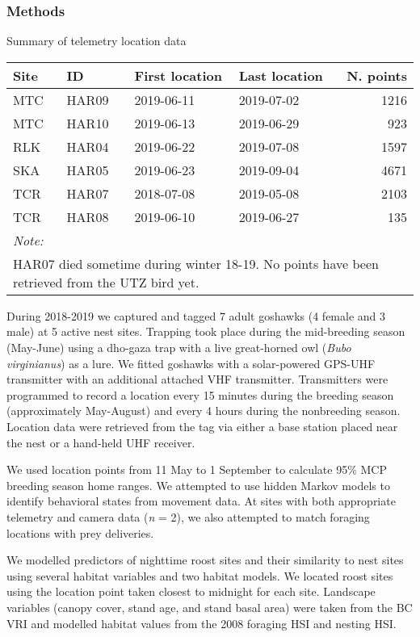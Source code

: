 \documentclass[]{article}
\begin{document}
\subsubsection{Methods}\label{methods-1}

\begin{capctable}

\caption{\label{tab:unnamed-chunk-4}Summary of telemetry location data}
\centering
\begin{tabular}[t]{llllr}
\toprule
Site & ID & First location & Last location & N. points\\
\midrule
MTC & HAR09 & 2019-06-11 & 2019-07-02 & 1216\\
MTC & HAR10 & 2019-06-13 & 2019-06-29 & 923\\
RLK & HAR04 & 2019-06-22 & 2019-07-08 & 1597\\
SKA & HAR05 & 2019-06-23 & 2019-09-04 & 4671\\
TCR & HAR07 & 2018-07-08 & 2019-05-08 & 2103\\
\addlinespace
TCR & HAR08 & 2019-06-10 & 2019-06-27 & 135\\
\bottomrule
\multicolumn{5}{l}{\textit{Note: }}\\
\multicolumn{5}{l}{HAR07 died sometime during winter 18-19. No points have been retrieved from the UTZ bird yet.}\\
\end{tabular}
\end{capctable}

During 2018-2019 we captured and tagged 7 adult goshawks (4 female and 3
male) at 5 active nest sites. Trapping took place during the
mid-breeding season (May-June) using a dho-gaza trap with a live
great-horned owl (\emph{Bubo virginianus}) as a lure. We fitted goshawks
with a solar-powered GPS-UHF transmitter with an additional attached VHF
transmitter. Transmitters were programmed to record a location every 15
minutes during the breeding season (approximately May-August) and every
4 hours during the nonbreeding season. Location data were retrieved from
the tag via either a base station placed near the nest or a hand-held
UHF receiver.

We used location points from 11 May to 1 September to calculate 95\% MCP
breeding season home ranges. We attempted to use hidden Markov models to
identify behavioral states from movement data. At sites with both
appropriate telemetry and camera data (\emph{n} = 2), we also attempted
to match foraging locations with prey deliveries.

We modelled predictors of nighttime roost sites and their similarity to
nest sites using several habitat variables and two habitat models. We
located roost sites using the location point taken closest to midnight
for each site. Landscape variables (canopy cover, stand age, and stand
basal area) were taken from the BC VRI and modelled habitat values from
the 2008 foraging HSI and nesting HSI.
\end{document}
